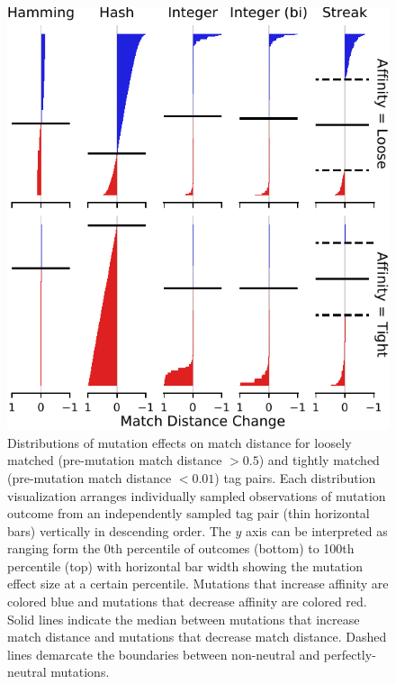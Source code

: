 \begin{figure}
\begin{center}

\includegraphics[width=\columnwidth]{img/mutational_step/bitweight=0dot5+seed=1+title=low-mutational-step+_data_hathash_hash=95a57768de56995a+_script_fullcat_hash=78f9965681c3a44b+ext=}
\caption{
Distributions of mutation effects on match distance for loosely matched (pre-mutation match distance $> 0.5$) and tightly matched (pre-mutation match distance $< 0.01$) tag pairs.
Each distribution visualization arranges individually sampled observations of mutation outcome from an independently sampled tag pair (thin horizontal bars) vertically in descending order.
The $y$ axis can be interpreted as ranging form the 0th percentile of outcomes (bottom) to 100th percentile (top) with horizontal bar width showing the mutation effect size at a certain percentile.
Mutations that increase affinity are colored blue and mutations that decrease affinity are colored red.
Solid lines indicate the median between mutations that increase match distance and mutations that decrease match distance.
Dashed lines demarcate the boundaries between non-neutral and perfectly-neutral mutations.
}
\label{fig:mutational_step}

\end{center}
\end{figure}
